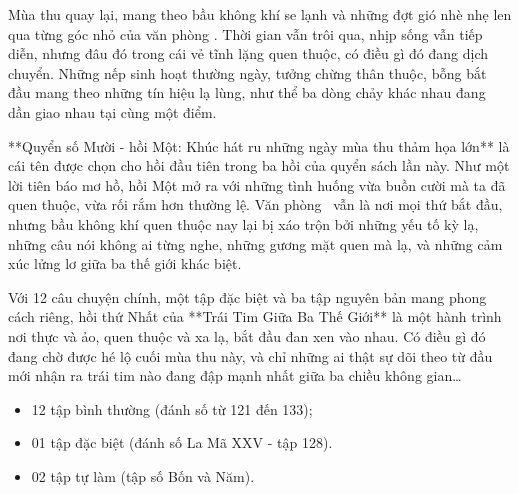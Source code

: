 \documentclass[main.tex]{subfiles}
\begin{document}
Mùa thu quay lại, mang theo bầu không khí se lạnh và những đợt gió nhè nhẹ len qua từng góc nhỏ của văn phòng \hll. Thời gian vẫn trôi qua, nhịp sống vẫn tiếp diễn, nhưng đâu đó trong cái vẻ tĩnh lặng quen thuộc, có điều gì đó đang dịch chuyển. Những nếp sinh hoạt thường ngày, tưởng chừng thân thuộc, bỗng bắt đầu mang theo những tín hiệu lạ lùng, như thể ba dòng chảy khác nhau đang dần giao nhau tại cùng một điểm.

**Quyển số Mười - hồi Một: Khúc hát ru những ngày mùa thu thảm họa lớn** là cái tên được chọn cho hồi đầu tiên trong ba hồi của quyển sách lần này. Như một lời tiên báo mơ hồ, hồi Một mở ra với những tình huống vừa buồn cười mà ta đã quen thuộc, vừa rối rắm hơn thường lệ. Văn phòng \hll\ vẫn là nơi mọi thứ bắt đầu, nhưng bầu không khí quen thuộc nay lại bị xáo trộn bởi những yếu tố kỳ lạ, những câu nói không ai từng nghe, những gương mặt quen mà lạ, và những cảm xúc lửng lơ giữa ba thế giới khác biệt.



Với 12 câu chuyện chính, một tập đặc biệt và ba tập nguyên bản mang phong cách riêng, hồi thứ Nhất của **Trái Tim Giữa Ba Thế Giới** là một hành trình nơi thực và ảo, quen thuộc và xa lạ, bắt đầu đan xen vào nhau. Có điều gì đó đang chờ được hé lộ cuối mùa thu này, và chỉ những ai thật sự dõi theo từ đầu mới nhận ra trái tim nào đang đập mạnh nhất giữa ba chiều không gian\dots

{}
\begin{itemize}
    \item 12 tập bình thường (đánh số từ 121 đến 133);
    \item 01 tập đặc biệt (đánh số La Mã XXV - tập 128).
    \item 02 tập tự làm (tập số Bốn và Năm).
\end{itemize}
\end{document}
